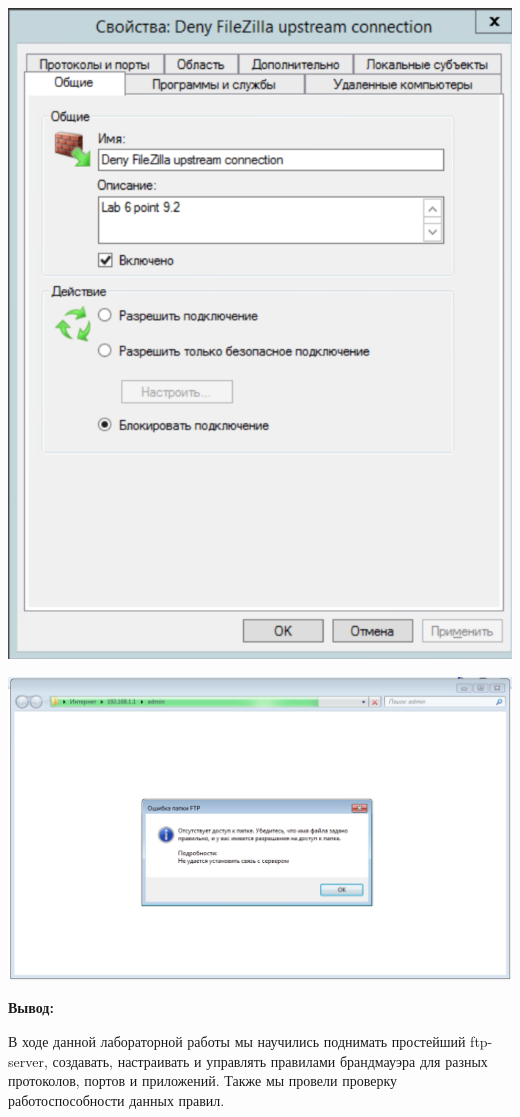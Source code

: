 \documentclass[a4paper,14pt]{extarticle}
\begin{document}
    \begin{center}
        \includegraphics[scale=0.7]{9.2.1.png}
    \end{center}

    \begin{center}
        \includegraphics[scale=0.6]{9.2.2.png}
    \end{center}

    \textbf{Вывод:}

    В ходе данной лабораторной работы мы научились поднимать простейший ftp-server, создавать, настраивать и управлять правилами брандмауэра для разных протоколов, портов и приложений. Также мы провели проверку работоспособности данных правил.
  
\end{document}
